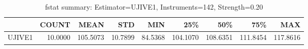 \begin{table}[ht]
\centering
\caption{fstat summary: Estimator=UJIVE1, Instruments=142, Strength=0.20}
\begin{tabular}{lrrrrrrrr}
\toprule
 & COUNT & MEAN & STD & MIN & 25\% & 50\% & 75\% & MAX \\
\midrule
UJIVE1 & 10.0000 & 105.5073 & 10.7899 & 84.5368 & 104.1070 & 108.6351 & 111.8454 & 117.8616 \\
\bottomrule
\end{tabular}
\end{table}
